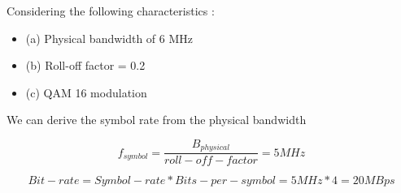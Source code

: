 Considering the following characteristics :

    \begin{itemize}
        \item (a) Physical bandwidth of 6 MHz
        \item (b) Roll-off factor = 0.2 
        \item (c) QAM 16 modulation 
    \end{itemize}

We can derive the symbol rate from the physical bandwidth

\begin{equation*}
    f_{symbol} = \frac{B_{physical}}{roll-off-factor} = 5 MHz
\end{equation*}

\begin{equation*}
    Bit-rate = Symbol-rate * Bits-per-symbol = 5MHz*4 = 20 MBps
\end{equation*}

